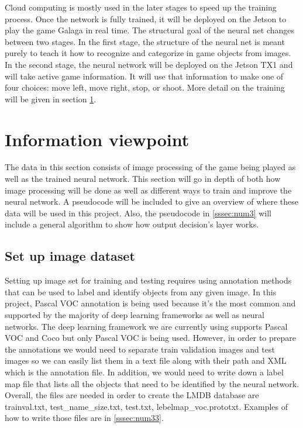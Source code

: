 Cloud computing is mostly used in the later stages to speed up the training process.
Once the network is fully trained, it will be deployed on the Jetson to play the game Galaga in real time.
\newline
\newline
The structural goal of the neural net changes between two stages.
In the first stage, the structure of the neural net is meant purely to teach it how to recognize and categorize in game objects from images.
In the second stage, the neural network will be deployed on the Jetson TX1 and will take active game information.
It will use that information to make one of four choices: move left, move right, stop, or shoot.
More detail on the training will be given in section \ref{sssec:num2}.

\section{Information viewpoint}\label{sssec:num2}%

The data in this section consists of image processing of the game being played as well as the trained neural network.
This section will go in depth of both how image processing will be done as well as different ways to train and improve the neural network.
A pseudocode will be included to give an overview of where these data will be used in this project.
Also, the pseudocode in \ref{sssec:num3} will include a general algorithm to show how output decision's layer works.

\subsection{Set up image dataset}%

Setting up image set for training and testing requires using annotation methods that can be used to label and identify objects from any given image.
In this project, Pascal VOC annotation is being used because it's the most common and supported by the majority of deep learning frameworks as well as neural networks.
The deep learning framework we are currently using supports Pascal VOC and Coco but only Pascal VOC is being used.
However, in order to prepare the annotations we would need to separate train validation images and test images so we can easily list them in a text file along with their path and XML which is the annotation file.
In addition, we would need to write down a label map file that lists all the objects that need to be identified by the neural network.
Overall, the files are needed in order to create the LMDB database are trainval.txt, test_name_size.txt, test.txt, lebelmap_voc.prototxt.
Examples of how to write those files are in \ref{sssec:num33}.
